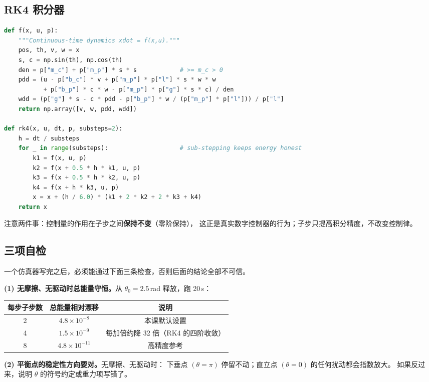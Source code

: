 \subsection{RK4 积分器}

\begin{lstlisting}[language=Python,caption={核心仿真循环（节选，注释为英文以避免排版问题）}]
def f(x, u, p):
    """Continuous-time dynamics xdot = f(x,u)."""
    pos, th, v, w = x
    s, c = np.sin(th), np.cos(th)
    den = p["m_c"] + p["m_p"] * s * s            # >= m_c > 0
    pdd = (u - p["b_c"] * v + p["m_p"] * p["l"] * s * w * w
           + p["b_p"] * c * w - p["m_p"] * p["g"] * s * c) / den
    wdd = (p["g"] * s - c * pdd - p["b_p"] * w / (p["m_p"] * p["l"])) / p["l"]
    return np.array([v, w, pdd, wdd])

def rk4(x, u, dt, p, substeps=2):
    h = dt / substeps
    for _ in range(substeps):                    # sub-stepping keeps energy honest
        k1 = f(x, u, p)
        k2 = f(x + 0.5 * h * k1, u, p)
        k3 = f(x + 0.5 * h * k2, u, p)
        k4 = f(x + h * k3, u, p)
        x = x + (h / 6.0) * (k1 + 2 * k2 + 2 * k3 + k4)
    return x
\end{lstlisting}

注意两件事：控制量的作用在子步之间\textbf{保持不变}（零阶保持），
这正是真实数字控制器的行为；子步只提高积分精度，不改变控制律。

\subsection{三项自检}

一个仿真器写完之后，必须能通过下面三条检查，否则后面的结论全部不可信。

\textbf{(1) 无摩擦、无驱动时总能量守恒。}从 $\theta_0=2.5$\,rad 释放，跑 20\,s：

\begin{center}
\small
\begin{tabular}{@{}ccc@{}}
\toprule
每步子步数 & 总能量相对漂移 & 说明 \\
\midrule
2 & $4.8\times10^{-8}$ & 本课默认设置 \\
4 & $1.5\times10^{-9}$ & 每加倍约降 32 倍（RK4 的四阶收敛）\\
8 & $4.8\times10^{-11}$ & 高精度参考 \\
\bottomrule
\end{tabular}
\end{center}

\textbf{(2) 平衡点的稳定性方向要对。}无摩擦、无驱动时：
下垂点 $(\theta=\pi)$ 停留不动；直立点 $(\theta=0)$ 的任何扰动都会指数放大。
如果反过来，说明 $\theta$ 的符号约定或重力项写错了。

